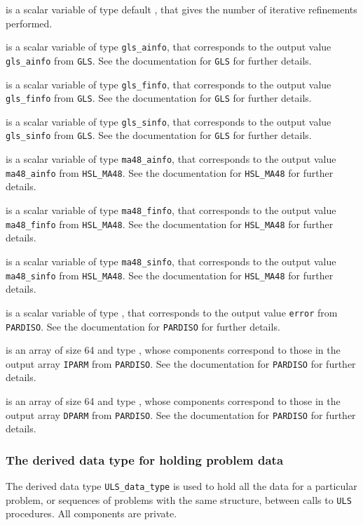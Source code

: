 \documentclass{galahad}
\newcommand{\packagename}{ULS}
\begin{document}
\begin{description}
 is a scalar variable of type default \integer,
that gives the number of iterative refinements performed.

 is a scalar variable of type {\tt gls\_ainfo},
that corresponds to the output value {\tt gls\_ainfo}
from {\tt GLS}. See the documentation for {\tt GLS} for further
details.

 is a scalar variable of type {\tt gls\_finfo},
that corresponds to the output value {\tt gls\_finfo}
from {\tt GLS}. See the documentation for {\tt GLS} for further
details.

 is a scalar variable of type {\tt gls\_sinfo},
that corresponds to the output value {\tt gls\_sinfo}
from {\tt GLS}. See the documentation for {\tt GLS} for further
details.

 is a scalar variable of type {\tt ma48\_ainfo},
that corresponds to the output value {\tt ma48\_ainfo}
from {\tt HSL\_MA48}. See the documentation for {\tt HSL\_MA48} for further
details.

 is a scalar variable of type {\tt ma48\_finfo},
that corresponds to the output value {\tt ma48\_finfo}
from {\tt HSL\_MA48}. See the documentation for {\tt HSL\_MA48} for further
details.

 is a scalar variable of type {\tt ma48\_sinfo},
that corresponds to the output value {\tt ma48\_sinfo}
from {\tt HSL\_MA48}. See the documentation for {\tt HSL\_MA48} for further
details.

 is a scalar variable of type \integer,
that corresponds to the output value {\tt error}
from {\tt PARDISO}. See the documentation for {\tt PARDISO} for further
details.

 is an array of size 64 and type \integer,
whose components correspond to those in the output array {\tt IPARM}
from {\tt PARDISO}. See the documentation for {\tt PARDISO} for further
details.

 is an array of size 64 and type \realdp,
whose components correspond to those in the output array {\tt DPARM}
from {\tt PARDISO}. See the documentation for {\tt PARDISO} for further
details.

\end{description}


\subsubsection{The derived data type for holding problem data}\label{typedata}
The derived data type
{\tt \packagename\_data\_type}
is used to hold all the data for a particular problem,
or sequences of problems with the same structure, between calls to
{\tt \packagename} procedures.
All components are private.
\end{document}
